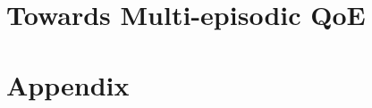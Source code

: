 \documentclass[
		twoside,openright,titlepage,numbers=noenddot,headinclude,%
                footinclude=true,cleardoublepage=empty,
                BCOR=5mm,paper=a4,fontsize=11pt, %
                ngerman,american, %
                ]{scrreprt}
\begin{document}
\part{Towards Multi-episodic QoE}\cleardoublepage






\part{Appendix}\cleardoublepage
{} %
\setcounter{page}{1}



\cleardoublepage %



\end{document}
